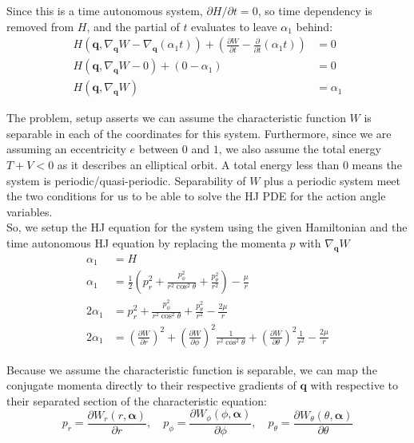 \documentclass[titlepage]{article}
\begin{document}
Since this is a time autonomous system, $\partial H/\partial t=0$, so time dependency is removed from $H$, and the partial of $t$ evaluates to leave $\alpha_1$ behind:
\begin{equation}
	\begin{split}
		H\left(\boldsymbol{q},\nabla_{\boldsymbol{q}}W-\nabla_{\boldsymbol{q}}(\alpha_1 t)\right)+\left(\frac{\partial W}{\partial t}-\frac{\partial}{\partial t}(\alpha_1 t)\right)&=0\\
		H\left(\boldsymbol{q},\nabla_{\boldsymbol{q}}W-0\right)+\left(0-\alpha_1\right)&=0\\
		H\left(\boldsymbol{q},\nabla_{\boldsymbol{q}}W\right)&=\alpha_1
	\end{split}
	\label{eq:timeindependenthj}
\end{equation}

The problem, setup asserts we can assume the characteristic function $W$ is separable in each of the coordinates for this system. Furthermore, since we are assuming an eccentricity $e$ between $0$ and $1$, we also assume the total energy $T+V<0$ as it describes an elliptical orbit. A total energy less than $0$ means the system is periodic/quasi-periodic. Separability of $W$ plus a periodic system meet the two conditions for us to be able to solve the HJ PDE for the action angle variables. \\

So, we setup the HJ equation for the system using the given Hamiltonian and the time autonomous HJ equation by replacing the momenta $p$ with $\nabla_{\boldsymbol{q}}W$
\begin{equation}
	\begin{split}
		\alpha_1&=H \\
		\alpha_1&=\frac{1}{2}\left(p_r^2+\frac{p_\phi^2}{r^2\cos^2\theta}+\frac{p_\theta^2}{r^2}\right)-\frac{\mu}{r} \\
		2\alpha_1&=p_r^2+\frac{p_\phi^2}{r^2\cos^2\theta}+\frac{p_\theta^2}{r^2}-\frac{2\mu}{r} \\
		2\alpha_1&=\left(\frac{\partial W}{\partial r}\right)^2+\left(\frac{\partial W}{\partial\phi}\right)^2\frac{1}{r^2\cos^2\theta}+\left(\frac{\partial W}{\partial\theta}\right)^2\frac{1}{r^2}-\frac{2\mu}{r}
	\end{split}
\end{equation}

Because we assume the characteristic function is separable, we can map the conjugate momenta directly to their respective gradients of $\boldsymbol{q}$ with respective to their separated section of the characteristic equation:
\begin{equation}
	p_r=\frac{\partial W_r(r,\boldsymbol{\alpha})}{\partial r},\quad p_\phi=\frac{\partial W_\phi(\phi,\boldsymbol{\alpha})}{\partial \phi},\quad p_\theta=\frac{\partial W_\theta(\theta,\boldsymbol{\alpha})}{\partial \theta}
\end{equation}
\end{document}
